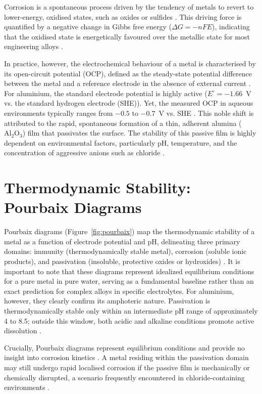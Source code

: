 \documentclass[11pt,twoside,a4paper,final]{report}
\begin{document}
Corrosion is a spontaneous process driven by the tendency of metals to revert to lower-energy, oxidised states, such as oxides or sulfides \cite{Sastri2007, Revie2008, Vargel2020}. This driving force is quantified by a negative change in Gibbs free energy ($\Delta G = -nFE$), indicating that the oxidised state is energetically favoured over the metallic state for most engineering alloys \cite{Sastri2007, Ghali2010}. 

In practice, however, the electrochemical behaviour of a metal is characterised by its open-circuit potential (OCP), defined as the steady-state potential difference between the metal and a reference electrode in the absence of external current \cite{Vargel2020, Roberge2000}. For aluminium, the standard electrode potential is highly active ($E^\circ = -1.66$~V vs. the standard hydrogen electrode (SHE)). Yet, the measured OCP in aqueous environments typically ranges from $-0.5$ to $-0.7$~V vs. SHE \cite{Vargel2020, Revie2008}. This noble shift is attributed to the rapid, spontaneous formation of a thin, adherent alumina ($\mathrm{Al_2O_3}$) film that passivates the surface. The stability of this passive film is highly dependent on environmental factors, particularly pH, temperature, and the concentration of aggressive anions such as chloride \cite{Vargel2020, Sastri2007, Ghali2010, Revie2008}.

\section{Thermodynamic Stability: Pourbaix Diagrams}
\label{sec:pourbaix}

Pourbaix diagrams (Figure~\ref{fig:pourbaix}) map the thermodynamic stability of a metal as a function of electrode potential and pH, delineating three primary domains: immunity (thermodynamically stable metal), corrosion (soluble ionic products), and passivation (insoluble, protective oxides or hydroxides) \cite{Revie2008, Ghali2010}. It is important to note that these diagrams represent idealized equilibrium conditions for a pure metal in pure water, serving as a fundamental baseline rather than an exact prediction for complex alloys in specific electrolytes. For aluminium, however, they clearly confirm its amphoteric nature. Passivation is thermodynamically stable only within an intermediate pH range of approximately 4 to 8.5; outside this window, both acidic and alkaline conditions promote active dissolution \cite{Vargel2020, Ghali2010, Revie2008}.

Crucially, Pourbaix diagrams represent equilibrium conditions and provide no insight into corrosion kinetics \cite{Revie2008, Ghali2010}. A metal residing within the passivation domain may still undergo rapid localised corrosion if the passive film is mechanically or chemically disrupted, a scenario frequently encountered in chloride-containing environments \cite{Vargel2020, Sastri2007}.
\end{document}

